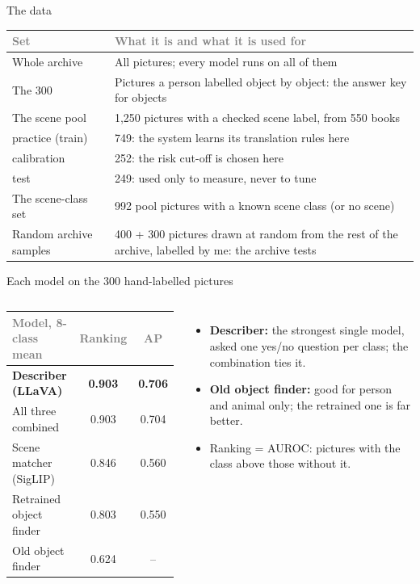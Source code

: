 \documentclass[aspectratio=169,11pt]{beamer}
\newcommand{\h}[1]{\textcolor{grey}{#1}}
\begin{document}
\begin{frame}{The data}
\small\begin{tabular}{@{}L{4.2cm} L{8.6cm}@{}}
\toprule
\h{Set} & \h{What it is and what it is used for}\\
\midrule
Whole archive & All pictures; every model runs on all of them\\
The 300 & Pictures a person labelled object by object: the answer key for objects\\
The scene pool & 1,250 pictures with a checked scene label, from 550 books\\
\quad practice (train) & 749: the system learns its translation rules here\\
\quad calibration & 252: the risk cut-off is chosen here\\
\quad test & 249: used only to measure, never to tune\\
The scene-class set & 992 pool pictures with a known scene class (or no scene)\\
Random archive samples & 400 + 300 pictures drawn at random from the rest of the archive, labelled by me: the archive tests\\
\bottomrule
\end{tabular}
\end{frame}

\begin{frame}{Each model on the 300 hand-labelled pictures}
\begin{columns}[T]
\small
\begin{tabular}{@{}l c c@{}}
\toprule
\h{Model, 8-class mean} & \h{Ranking} & \h{AP}\\
\midrule
\textbf{Describer (LLaVA)} & \textbf{0.903} & \textbf{0.706}\\
All three combined & 0.903 & 0.704\\
Scene matcher (SigLIP) & 0.846 & 0.560\\
Retrained object finder & 0.803 & 0.550\\
Old object finder & 0.624 & --\\
\bottomrule
\end{tabular}
\small
\begin{itemize}\setlength\itemsep{6pt}
  \item \textbf{Describer:} the strongest single model, asked one yes/no question per class; the combination ties it.
  \item \textbf{Old object finder:} good for person and animal only; the retrained one is far better.
  \item Ranking = AUROC: pictures with the class above those without it.
\end{itemize}
\end{columns}
\end{frame}
\end{document}
